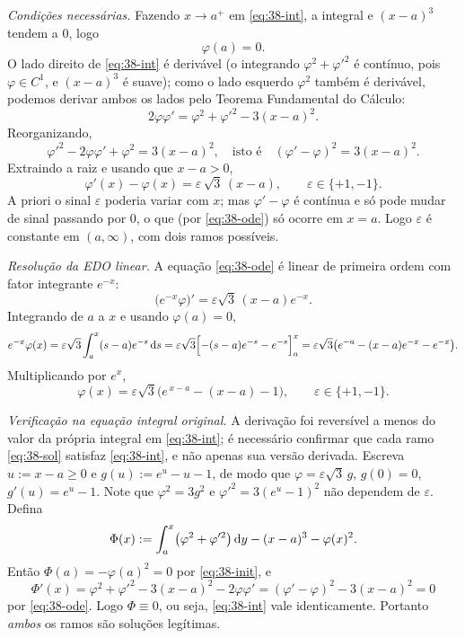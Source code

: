 \emph{Condições necessárias.}
Fazendo $x\to a^+$ em \eqref{eq:38-int}, a integral e $(x-a)^3$ tendem a $0$, logo
\begin{equation}\label{eq:38-init}
\varphi(a)=0.
\end{equation}
O lado direito de \eqref{eq:38-int} é derivável (o integrando $\varphi^2+\varphi'^2$ é contínuo, pois $\varphi\in C^1$, e $(x-a)^3$ é suave); como o lado esquerdo $\varphi^2$ também é derivável, podemos derivar ambos os lados pelo Teorema Fundamental do Cálculo:
\[
2\varphi\varphi'=\varphi^2+\varphi'^2-3(x-a)^2.
\]
Reorganizando,
\[
\varphi'^2-2\varphi\varphi'+\varphi^2=3(x-a)^2,
\quad\text{isto é}\quad
(\varphi'-\varphi)^2=3(x-a)^2.
\]
Extraindo a raiz e usando que $x-a>0$,
\begin{equation}\label{eq:38-ode}
\varphi'(x)-\varphi(x)=\varepsilon\,\sqrt3\,(x-a),\qquad \varepsilon\in\{+1,-1\}.
\end{equation}
A priori o sinal $\varepsilon$ poderia variar com $x$; mas $\varphi'-\varphi$ é contínua e só pode mudar de sinal passando por $0$, o que (por \eqref{eq:38-ode}) só ocorre em $x=a$. Logo $\varepsilon$ é constante em $(a,\infty)$, com dois ramos possíveis.

\emph{Resolução da EDO linear.}
A equação \eqref{eq:38-ode} é linear de primeira ordem com fator integrante $e^{-x}$:
\[
\bigl(e^{-x}\varphi\bigr)'=\varepsilon\sqrt3\,(x-a)e^{-x}.
\]
Integrando de $a$ a $x$ e usando $\varphi(a)=0$,
\[
e^{-x}\varphi(x)=\varepsilon\sqrt3\int_a^x(s-a)e^{-s}\,\mathrm{d} s
=\varepsilon\sqrt3\Bigl[-(s-a)e^{-s}-e^{-s}\Bigr]_a^x
=\varepsilon\sqrt3\bigl(e^{-a}-(x-a)e^{-x}-e^{-x}\bigr).
\]
Multiplicando por $e^x$,
\begin{equation}\label{eq:38-sol}
\varphi(x)=\varepsilon\sqrt3\bigl(e^{\,x-a}-(x-a)-1\bigr),\qquad \varepsilon\in\{+1,-1\}.
\end{equation}

\emph{Verificação na equação integral original.}
A derivação foi reversível a menos do valor da própria integral em \eqref{eq:38-int}; é necessário confirmar que cada ramo \eqref{eq:38-sol} satisfaz \eqref{eq:38-int}, e não apenas sua versão derivada. Escreva $u:=x-a\ge0$ e $g(u):=e^{u}-u-1$, de modo que $\varphi=\varepsilon\sqrt3\,g$, $g(0)=0$, $g'(u)=e^{u}-1$. Note que $\varphi^2=3g^2$ e $\varphi'^2=3(e^u-1)^2$ não dependem de $\varepsilon$. Defina
\[
\Phi(x):=\int_a^x\bigl(\varphi^2+\varphi'^2\bigr)\,\mathrm{d} y-(x-a)^3-\varphi(x)^2 .
\]
Então $\Phi(a)=-\varphi(a)^2=0$ por \eqref{eq:38-init}, e
\[
\Phi'(x)=\varphi^2+\varphi'^2-3(x-a)^2-2\varphi\varphi'=(\varphi'-\varphi)^2-3(x-a)^2=0
\]
por \eqref{eq:38-ode}. Logo $\Phi\equiv0$, ou seja, \eqref{eq:38-int} vale identicamente. Portanto \emph{ambos} os ramos são soluções legítimas.

